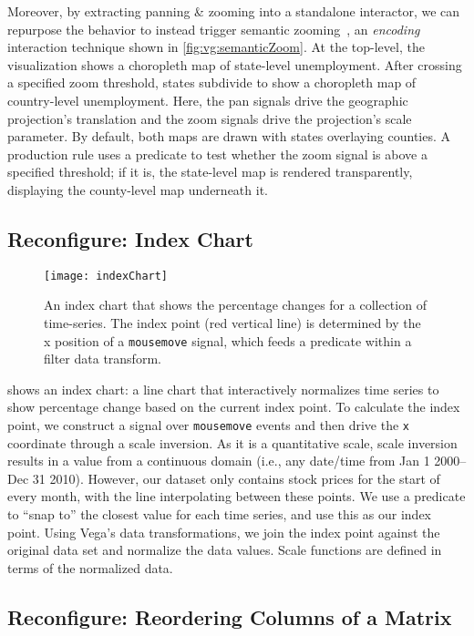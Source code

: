 Moreover, by extracting panning \& zooming into a standalone interactor, we can
repurpose the behavior to instead trigger semantic zooming~\cite{perlin:pad}, an
\emph{encoding} interaction technique shown in \cref{fig:vg:semanticZoom}. At
the top-level, the visualization shows a choropleth map of state-level
unemployment. After crossing a specified zoom threshold, states subdivide to
show a choropleth map of country-level unemployment. Here, the pan signals drive
the geographic projection's translation and the zoom signals drive the
projection's scale parameter. By default, both maps are drawn with states
overlaying counties. A production rule uses a predicate to test whether the zoom
signal is above a specified threshold; if it is, the state-level map is rendered
transparently, displaying the county-level map underneath it.

\subsection{Reconfigure: Index Chart}

\begin{figure}[h!]
  \centering
  \texttt{[image: indexChart]}
  \caption{An index chart that shows the percentage changes for a collection of
  time-series. The index point (red vertical line) is determined by the x
  position of a \texttt{mousemove} signal, which feeds a predicate within a
  filter data transform.}
  \label{fig:vg:indexChart}
\end{figure}

 shows an index chart: a line chart that interactively
normalizes time series to show percentage change based on the current index
point. To calculate the index point, we construct a signal over
\texttt{mousemove} events and then drive the \texttt{x} coordinate through a
scale inversion. As it is a quantitative scale, scale inversion results in a
value from a continuous domain (i.e., any date/time from Jan 1 2000--Dec 31
2010). However, our dataset only contains stock prices for the start of every
month, with the line interpolating between these points. We use a predicate to
``snap to'' the closest value for each time series, and use this as our index
point. Using Vega's data transformations, we join the index point against the
original data set and normalize the data values. Scale functions are defined in
terms of the normalized data.

\subsection{Reconfigure: Reordering Columns of a Matrix}

